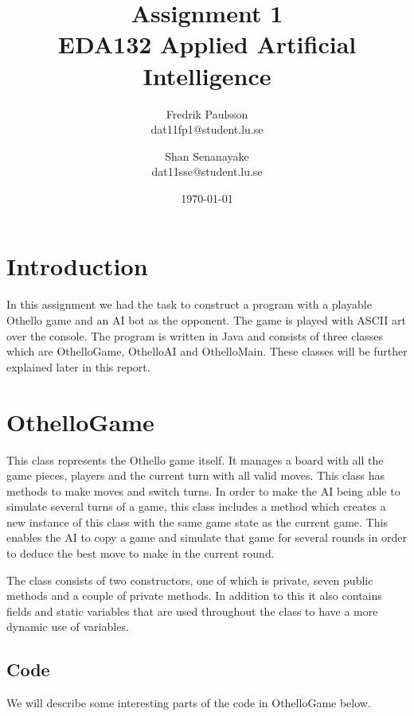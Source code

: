 \documentclass[a4paper]{article}
\title{Assignment 1 \\ EDA132 Applied Artificial Intelligence}
\date{\today}
\author{Fredrik Paulsson \\ dat11fp1@student.lu.se \and Shan Senanayake \\ dat11sse@student.lu.se}
\begin{document}
\maketitle


\section{Introduction}
In this assignment we had the task to construct a program with a playable Othello game and an AI bot as the opponent. The game is played with ASCII art over the console. The program is written in Java and consists of three classes which are OthelloGame, OthelloAI and OthelloMain. These classes will be further explained later in this report. \\

\section{OthelloGame}
This class represents the Othello game itself. It manages a board with all the game pieces, players and the current turn with all valid moves. This class has methods to make moves and switch turns. In order to make the AI being able to simulate several turns of a game, this class includes a method which creates a new instance of this class with the same game state as the current game. This enables the AI to copy a game and simulate that game for several rounds in order to deduce the best move to make in the current round.

The class consists of two constructors, one of which is private, seven public methods and a couple of private methods. In addition to this it also contains fields and static variables that are used throughout the class to have a more dynamic use of variables.

\subsection{Code}
We will describe some interesting parts of the code in OthelloGame below. 
\end{document}
